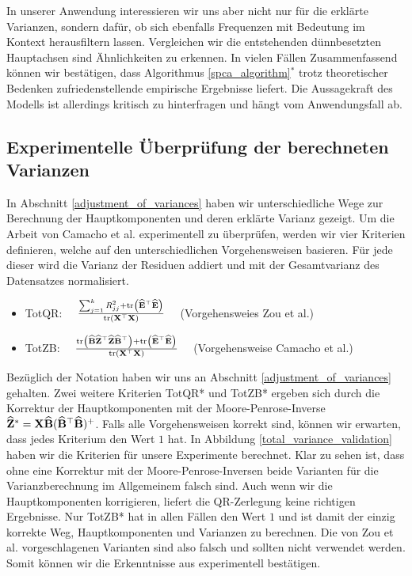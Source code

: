 In unserer Anwendung interessieren wir uns aber nicht nur für die erklärte Varianzen, sondern dafür, ob sich ebenfalls Frequenzen mit Bedeutung im Kontext herausfiltern lassen. Vergleichen wir die entstehenden dünnbesetzten Hauptachsen sind Ähnlichkeiten zu erkennen. In vielen Fällen
Zusammenfassend können wir bestätigen, dass Algorithmus \ref{spca_algorithm}$^*$ trotz theoretischer Bedenken zufriedenstellende empirische Ergebnisse liefert. Die Aussagekraft des Modells ist allerdings kritisch zu hinterfragen und hängt vom Anwendungsfall ab. 





\subsection{Experimentelle Überprüfung der berechneten Varianzen}

In Abschnitt \ref{adjustment_of_variances} haben wir unterschiedliche Wege zur Berechnung der Hauptkomponenten und deren erklärte Varianz gezeigt. Um die Arbeit von Camacho et al. \cite{camacho} experimentell zu überprüfen, werden wir vier Kriterien definieren, welche auf den unterschiedlichen Vorgehensweisen basieren. Für jede dieser wird die Varianz der Residuen addiert und mit der Gesamtvarianz des Datensatzes normalisiert.
\begin{itemize}
\item TotQR: $\quad \frac{\sum_{j=1}^k R_{jj}^2 + \text{tr} \left( \widehat{\mathbf{E}}^{\top}\widehat{\mathbf{E}} \right)}{\text{tr} \left( \mathbf{X}^{\top}\mathbf{X} \right)} \quad$ (Vorgehensweies Zou et al.)
\item TotZB: $\quad \frac{\text{tr} \left( \widehat{\mathbf{B}} \widehat{\mathbf{Z}}^{\top} \widehat{\mathbf{Z}} \widehat{\mathbf{B}}^{\top} \right) + \text{tr} \left( \widehat{\mathbf{E}}^{\top}\widehat{\mathbf{E}} \right)}{\text{tr} \left( \mathbf{X}^{\top}\mathbf{X} \right)} \quad$ (Vorgehensweise Camacho et al.)
\end{itemize}
Bezüglich der Notation haben wir uns an Abschnitt \ref{adjustment_of_variances} gehalten. Zwei weitere Kriterien TotQR* und TotZB* ergeben sich durch die Korrektur der Hauptkomponenten mit der Moore-Penrose-Inverse $\widehat{\mathbf{Z}}^* = \mathbf{X} \widehat{\mathbf{B}} (\widehat{\mathbf{B}}^{\top}\widehat{\mathbf{B}})^+$. Falls alle Vorgehensweisen korrekt sind, können wir erwarten, dass jedes Kriterium den Wert $1$ hat. In Abbildung \ref{total_variance_validation} haben wir die Kriterien für unsere Experimente berechnet. Klar zu sehen ist, dass ohne eine Korrektur mit der Moore-Penrose-Inversen beide Varianten für die Varianzberechnung im Allgemeinem falsch sind. Auch wenn wir die Hauptkomponenten korrigieren, liefert die QR-Zerlegung keine richtigen Ergebnisse. Nur TotZB* hat in allen Fällen den Wert $1$ und ist damit der einzig korrekte Weg, Hauptkomponenten und Varianzen zu berechnen. Die von Zou et al. \cite{zou_sparsepca} vorgeschlagenen Varianten sind also falsch und sollten nicht verwendet werden. Somit können wir die Erkenntnisse aus \cite{camacho} experimentell bestätigen.

